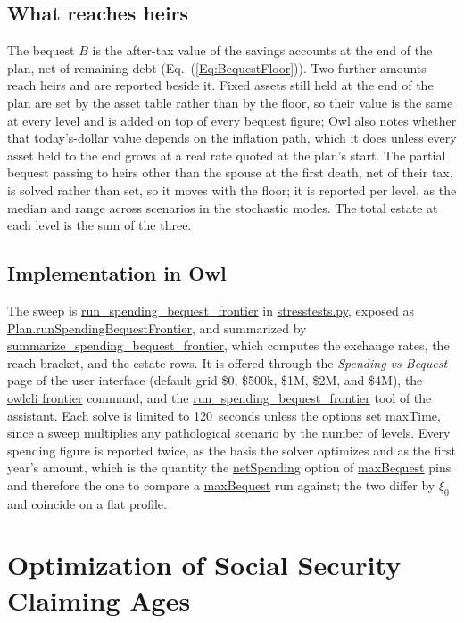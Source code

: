 \documentclass[fleqn,12pt]{report}
\newcommand{\code}[1]{\url{#1}}
\begin{document}
\section{What reaches heirs}
\label{sec:frontier-estate}

The bequest $B$ is the after-tax value of the savings accounts at the end of the plan, net of
remaining debt (Eq.~(\ref{Eq:BequestFloor})).
Two further amounts reach heirs and are reported beside it.
Fixed assets still held at the end of the plan are set by the asset table rather than by the floor,
so their value is the same at every level and is added on top of every bequest figure; Owl also
notes whether that today's-dollar value depends on the inflation path, which it does unless every
asset held to the end grows at a real rate quoted at the plan's start.
The partial bequest passing to heirs other than the spouse at the first death, net of their tax,
is solved rather than set, so it moves with the floor; it is reported per level, as the median and
range across scenarios in the stochastic modes.
The total estate at each level is the sum of the three.

\section{Implementation in Owl}

The sweep is \code{run_spending_bequest_frontier} in \code{stresstests.py}, exposed as
\code{Plan.runSpendingBequestFrontier}, and summarized by
\code{summarize_spending_bequest_frontier}, which computes the exchange rates, the reach bracket,
and the estate rows.
It is offered through the \emph{Spending vs Bequest} page of the user interface (default grid
\$0, \$500k, \$1M, \$2M, and \$4M), the \code{owlcli frontier} command, and the
\code{run_spending_bequest_frontier} tool of the assistant.
Each solve is limited to 120~seconds unless the options set \code{maxTime}, since a sweep multiplies
any pathological scenario by the number of levels.
Every spending figure is reported twice, as the basis the solver optimizes and as the first year's
amount, which is the quantity the \code{netSpending} option of \code{maxBequest} pins and
therefore the one to compare a \code{maxBequest} run against; the two differ by $\xi_0$ and
coincide on a flat profile.

\chapter{Optimization of Social Security Claiming Ages}
\label{Chap:SSAges}
\label{chap:ss-ages}
\end{document}
